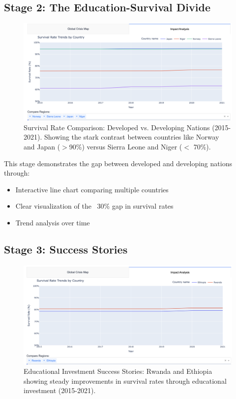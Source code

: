 \documentclass{article}
\begin{document}
\subsection{Stage 2: The Education-Survival Divide}
\begin{figure}[H]
    \centering
    \includegraphics[width=\textwidth]{survival_rates.png}
    \caption{Survival Rate Comparison: Developed vs. Developing Nations (2015-2021). Showing the stark contrast between countries like Norway and Japan ($>$90\%) versus Sierra Leone and Niger ($<$ 70\%).}
    \label{fig:comparison}
\end{figure}

This stage demonstrates the gap between developed and developing nations through:
\begin{itemize}
    \item Interactive line chart comparing multiple countries
    \item Clear visualization of the ~30\% gap in survival rates
    \item Trend analysis over time
\end{itemize}

\subsection{Stage 3: Success Stories}
\begin{figure}[H]
    \centering
    \includegraphics[width=\textwidth]{survival_rates2.png}
    \caption{Educational Investment Success Stories: Rwanda and Ethiopia showing steady improvements in survival rates through educational investment (2015-2021).}
    \label{fig:success}
\end{figure}
\end{document}
